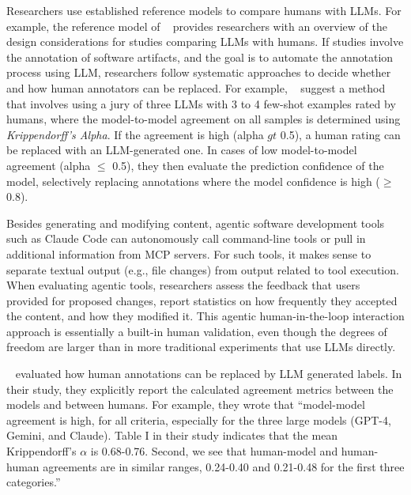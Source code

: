 Researchers \should use established reference models to compare humans with LLMs.
For example, the reference model of \citeauthor{Schneider2025ReferenceModel}~\cite{Schneider2025ReferenceModel} provides researchers with an overview of the design considerations for studies comparing LLMs with humans.
If studies involve the annotation of software artifacts, and the goal is to automate the annotation process using LLM, researchers \should follow systematic approaches to decide whether and how human annotators can be replaced.
For example, \citeauthor{DBLP:conf/msr/AhmedDTP25}~\cite{DBLP:conf/msr/AhmedDTP25} suggest a method that involves using a jury of three LLMs with 3 to 4 few-shot examples rated by humans, where the model-to-model agreement on all samples is determined using \emph{Krippendorff's Alpha}.
If the agreement is high (alpha $gt$ 0.5), a human rating can be replaced with an LLM-generated one.
In cases of low model-to-model agreement (alpha $\le$ 0.5), they then evaluate the prediction confidence of the model, selectively replacing annotations where the model confidence is high ($\ge$ 0.8).

Besides generating and modifying content, agentic software development tools such as Claude Code can autonomously call command-line tools or pull in additional information from MCP servers.
For such tools, it makes sense to separate textual output (e.g., file changes) from output related to tool execution.
When evaluating agentic tools, researchers \should assess the feedback that users provided for proposed changes, report statistics on how frequently they accepted the content, and how they modified it.
This agentic human-in-the-loop interaction approach is essentially a built-in human validation, even though the degrees of freedom are larger than in more traditional experiments that use LLMs directly.


\citeauthor{DBLP:conf/msr/AhmedDTP25}~\cite{DBLP:conf/msr/AhmedDTP25} evaluated how human annotations can be replaced by LLM generated labels.
In their study, they explicitly report the calculated agreement metrics between the models and between humans.
For example, they wrote that ``model-model agreement is high, for all criteria, especially for the three large models (GPT-4, Gemini, and Claude). Table I in their study indicates that the mean Krippendorff's $\alpha$ is 0.68-0.76.  Second, we see that human-model and human-human agreements are in similar ranges, 0.24-0.40 and 0.21-0.48 for the first three categories.''

